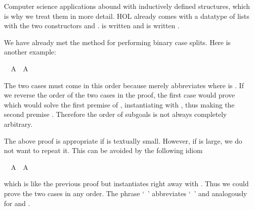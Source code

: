%
\begin{isabellebody}%
\def\isabellecontext{Induction}%
\isamarkupfalse%
%
\isamarkuptrue%
%
\begin{isamarkuptext}%
Computer science applications abound with inductively defined
structures, which is why we treat them in more detail. HOL already
comes with a datatype of lists with the two constructors 
and .  is written \isa{{\isacharbrackleft}{\isacharbrackright}} and  is written .%
\end{isamarkuptext}%
\isamarkuptrue%
%
\isamarkuptrue%
%
\begin{isamarkuptext}%
We have already met the  method for performing
binary case splits. Here is another example:%
\end{isamarkuptext}%
\isamarkuptrue%
\ {\isachardoublequote}{\isasymnot}\ A\ {\isasymor}\ A{\isachardoublequote}\isanewline
\isamarkupfalse%
\isamarkupfalse%
\isamarkupfalse%
\isamarkupfalse%
\isamarkupfalse%
\isamarkupfalse%
\isamarkupfalse%
\isamarkupfalse%
\isamarkupfalse%
\isamarkupfalse%
%
\begin{isamarkuptext}%
\noindent The two cases must come in this order because  merely abbreviates  where
 is . If we reverse
the order of the two cases in the proof, the first case would prove
 which would solve the first premise of
, instantiating  with , thus making the second premise .
Therefore the order of subgoals is not always completely arbitrary.

The above proof is appropriate if  is textually small.
However, if  is large, we do not want to repeat it. This can
be avoided by the following idiom%
\end{isamarkuptext}%
\isamarkuptrue%
\ {\isachardoublequote}{\isasymnot}\ A\ {\isasymor}\ A{\isachardoublequote}\isanewline
\isamarkupfalse%
\isamarkupfalse%
\isamarkupfalse%
\isamarkupfalse%
\isamarkupfalse%
\isamarkupfalse%
\isamarkupfalse%
\isamarkupfalse%
\isamarkupfalse%
\isamarkupfalse%
%
\begin{isamarkuptext}%
\noindent which is like the previous proof but instantiates
 right away with . Thus we could prove the two
cases in any order. The phrase `~'
abbreviates `~' and analogously for
 and .


\end{isamarkuptext}
\end{isabellebody}
